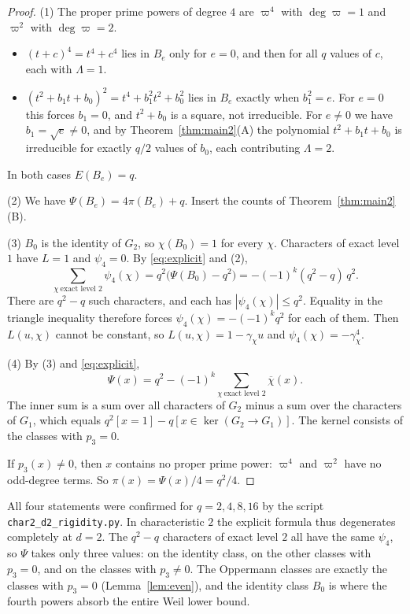 \documentclass[11pt,a4paper]{amsart}
\theoremstyle{definition}
\theoremstyle{remark}
\begin{document}
\begin{proof}
(1) The proper prime powers of degree $4$ are $\varpi^4$ with $\deg\varpi=1$ and $\varpi^2$ with $\deg\varpi=2$.
\begin{itemize}
\item $(t+c)^4=t^4+c^4$ lies in $B_e$ only for $e=0$, and then for all $q$ values of $c$, each with $\Lambda=1$.
\item $(t^2+b_1t+b_0)^2=t^4+b_1^2t^2+b_0^2$ lies in $B_e$ exactly when $b_1^2=e$. For $e=0$ this forces $b_1=0$, and
$t^2+b_0$ is a square, not irreducible. For $e\ne0$ we have $b_1=\sqrt e\ne0$, and by Theorem~\ref{thm:main2}(A) the polynomial
$t^2+b_1t+b_0$ is irreducible for exactly $q/2$ values of $b_0$, each contributing $\Lambda=2$.
\end{itemize}
In both cases $E(B_e)=q$.

(2) We have $\Psi(B_e)=4\pi(B_e)+q$. Insert the counts of Theorem~\ref{thm:main2}(B).

(3) $B_0$ is the identity of $G_2$, so $\chi(B_0)=1$ for every $\chi$. Characters of exact level $1$ have $L=1$ and
$\psi_4=0$. By \eqref{eq:explicit} and (2),
\[
\sum_{\chi\ \text{exact level }2}\psi_4(\chi)=q^2\bigl(\Psi(B_0)-q^2\bigr)=-(-1)^k(q^2-q)\,q^2 .
\]
There are $q^2-q$ such characters, and each has $|\psi_4(\chi)|\le q^2$. Equality in the triangle inequality
therefore forces $\psi_4(\chi)=-(-1)^kq^2$ for each of them. Then $L(u,\chi)$ cannot be constant, so
$L(u,\chi)=1-\gamma_\chi u$ and $\psi_4(\chi)=-\gamma_\chi^4$.

(4) By (3) and \eqref{eq:explicit},
\[
\Psi(x)=q^2-(-1)^k\sum_{\chi\ \text{exact level }2}\overline\chi(x).
\]
The inner sum is a sum over all characters of $G_2$ minus a sum over the characters of $G_1$, which equals
$q^2[x=1]-q[x\in\ker(G_2\to G_1)]$. The kernel consists of the classes with $p_3=0$.

If $p_3(x)\ne0$, then $x$ contains no proper prime power: $\varpi^4$ and $\varpi^2$ have no odd-degree terms. So
$\pi(x)=\Psi(x)/4=q^2/4$.
\end{proof}

All four statements were confirmed for $q=2,4,8,16$ by the script \texttt{char2\_d2\_rigidity.py}. In
characteristic $2$ the explicit formula thus degenerates completely at $d=2$. The $q^2-q$ characters of exact level
$2$ all have the same $\psi_4$, so $\Psi$ takes only three values: on the identity class, on the other classes with
$p_3=0$, and on the classes with $p_3\ne0$. The Oppermann classes are exactly the classes with $p_3=0$
(Lemma~\ref{lem:even}), and the identity class $B_0$ is where the fourth powers absorb the entire Weil lower bound.
\end{document}
